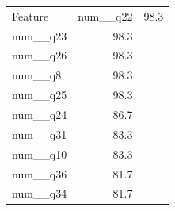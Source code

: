\begin{tabular}{lr}
\toprule
Feature & %
\midrule
num__q22 & 98.3 \\
num__q23 & 98.3 \\
num__q26 & 98.3 \\
num__q8 & 98.3 \\
num__q25 & 98.3 \\
num__q24 & 86.7 \\
num__q31 & 83.3 \\
num__q10 & 83.3 \\
num__q36 & 81.7 \\
num__q34 & 81.7 \\
\bottomrule
\end{tabular}

